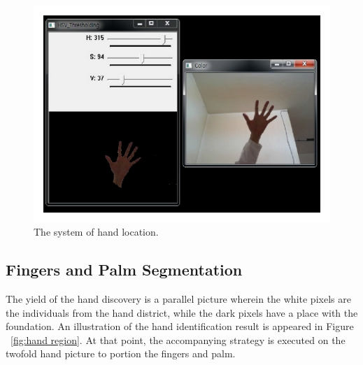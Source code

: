 \documentclass[a4paper]{article}
\begin{document}
\begin{figure}[h!]
 \begin{center}
  \includegraphics[scale=1.7]{fig2}
  \caption{The system of hand location.}
  \label{fig:hand location}
 \end{center}
\end{figure}



\pagebreak

\subsection{Fingers and Palm Segmentation}
The yield of the hand discovery is a parallel picture wherein the white pixels are the individuals from the hand district, while the dark pixels have a place with the foundation. An illustration of the hand identification result is appeared in Figure ~\ref{fig:hand region}. At that point, the accompanying strategy is executed on the twofold hand picture to portion the fingers and palm.
\end{document}
